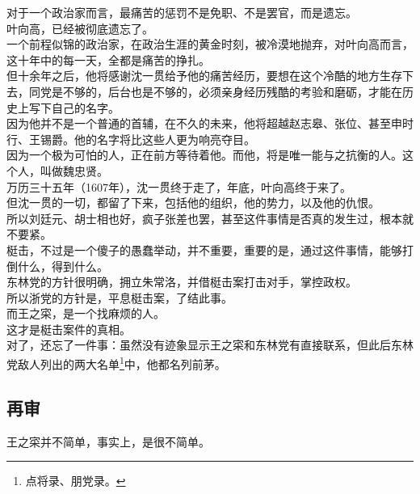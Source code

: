 \begin{multicols}{\theparacolNo}
对于一个政治家而言，最痛苦的惩罚不是免职、不是罢官，而是遗忘。\\

叶向高，已经被彻底遗忘了。\\

一个前程似锦的政治家，在政治生涯的黄金时刻，被冷漠地抛弃，对叶向高而言，这十年中的每一天，全都是痛苦的挣扎。\\

但十余年之后，他将感谢沈一贯给予他的痛苦经历，要想在这个冷酷的地方生存下去，同党是不够的，后台也是不够的，必须亲身经历残酷的考验和磨砺，才能在历史上写下自己的名字。\\

因为他并不是一个普通的首辅，在不久的未来，他将超越赵志皋、张位、甚至申时行、王锡爵。他的名字将比这些人更为响亮夺目。\\

因为一个极为可怕的人，正在前方等待着他。而他，将是唯一能与之抗衡的人。这个人，叫做魏忠贤。\\

万历三十五年（1607年），沈一贯终于走了，年底，叶向高终于来了。\\

但沈一贯的一切，都留了下来，包括他的组织，他的势力，以及他的仇恨。\\

所以刘廷元、胡士相也好，疯子张差也罢，甚至这件事情是否真的发生过，根本就不要紧。\\

梃击，不过是一个傻子的愚蠢举动，并不重要，重要的是，通过这件事情，能够打倒什么，得到什么。\\

东林党的方针很明确，拥立朱常洛，并借梃击案打击对手，掌控政权。\\

所以浙党的方针是，平息梃击案，了结此事。\\

而王之寀，是一个找麻烦的人。\\

这才是梃击案件的真相。\\

对了，还忘了一件事：虽然没有迹象显示王之寀和东林党有直接联系，但此后东林党敌人列出的两大名单\footnote{点将录、朋党录。}中，他都名列前茅。\\

\subsection{再审}
王之寀并不简单，事实上，是很不简单。\\


\end{multicols}
